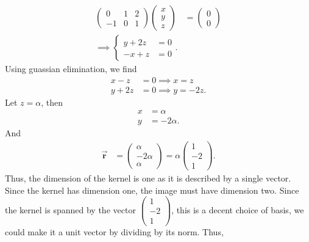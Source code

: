 \documentclass{report}
\begin{document}
\begin{itemize}
            \begin{align*}
                \begin{pmatrix} 0& 1 & 2 \\ -1 & 0 & 1\end{pmatrix}\begin{pmatrix}x \\ y\\ z \end{pmatrix} &= \begin{pmatrix} 0 \\ 0\end{pmatrix} \\
                \implies \begin{cases} y + 2z  &= 0 \\ -x + z &= 0 \end{cases}
            .\end{align*}
            Using guassian elimination, we find
            \begin{align*}
                x  - z &= 0 \implies x = z \\
                y + 2z &= 0 \implies y = -2z
            .\end{align*}
            Let $ z = \alpha$, then 
            \begin{align*}
                x&= \alpha \\
                y &= -2\alpha
            .\end{align*}
            And
            \begin{align*}
                \vec{\mathbf{r}} &= \begin{pmatrix} \alpha\\-2\alpha \\ \alpha \end{pmatrix} = \alpha \begin{pmatrix} 1 \\ -2 \\ 1\end{pmatrix}
            .\end{align*}
            Thus, the dimension of the kernel is one as it is described by a single vector. Since the kernel has dimension one, the image must have dimension two.
            \bigbreak \noindent 
            Since the kernel is spanned by the vector $\begin{pmatrix} 1 \\ -2 \\ 1\end{pmatrix} $, this is a decent choice of basis, we could make it a unit vector by dividing by its norm. Thus,

\end{itemize}
\end{document}
